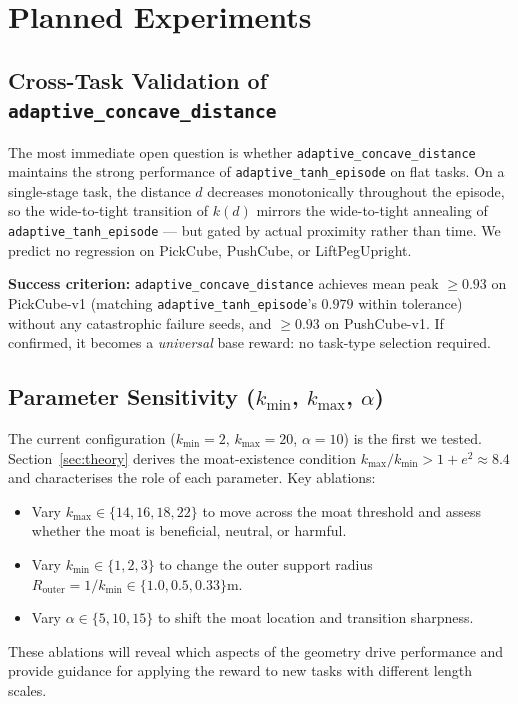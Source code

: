 \documentclass{article}
\begin{document}
\section{Planned Experiments}
\label{sec:planned}

\subsection{Cross-Task Validation of \texttt{adaptive\_concave\_distance}}

The most immediate open question is whether \texttt{adaptive\_concave\_distance}
maintains the strong performance of \texttt{adaptive\_tanh\_episode} on flat tasks.
On a single-stage task, the distance $d$ decreases monotonically throughout the episode,
so the wide-to-tight transition of $k(d)$ mirrors the wide-to-tight annealing of
\texttt{adaptive\_tanh\_episode} --- but gated by actual proximity rather than time.
We predict no regression on PickCube, PushCube, or LiftPegUpright.

\textbf{Success criterion:} \texttt{adaptive\_concave\_distance} achieves mean peak
$\geq 0.93$ on PickCube-v1 (matching \texttt{adaptive\_tanh\_episode}'s $0.979$
within tolerance) without any catastrophic failure seeds, and $\geq 0.93$ on PushCube-v1.
If confirmed, it becomes a \emph{universal} base reward: no task-type selection required.

\subsection{Parameter Sensitivity ($k_{\min}$, $k_{\max}$, $\alpha$)}

The current configuration ($k_{\min}=2$, $k_{\max}=20$, $\alpha=10$) is the first
we tested. Section~\ref{sec:theory} derives the moat-existence condition
$k_{\max}/k_{\min} > 1+e^2 \approx 8.4$ and characterises the role of each parameter.
Key ablations:
\begin{itemize}
    \item Vary $k_{\max} \in \{14, 16, 18, 22\}$ to move across the moat threshold
    and assess whether the moat is beneficial, neutral, or harmful.
    \item Vary $k_{\min} \in \{1, 2, 3\}$ to change the outer support radius
    $R_{\mathrm{outer}} = 1/k_{\min} \in \{1.0, 0.5, 0.33\}$m.
    \item Vary $\alpha \in \{5, 10, 15\}$ to shift the moat location and transition sharpness.
\end{itemize}
These ablations will reveal which aspects of the geometry drive performance and
provide guidance for applying the reward to new tasks with different length scales.
\end{document}

